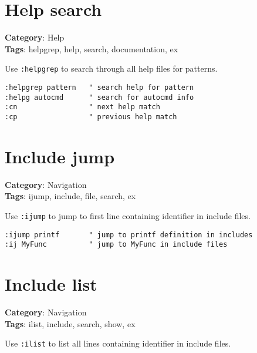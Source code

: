 {{{{{{\section{Help search}

\textbf{Category}: Help\\ \textbf{Tags}: helpgrep, help, search, documentation, ex
\vspace{0.5cm}

Use {\footnotesize \Verb§:helpgrep§} to search through all help files for patterns.

\begin{Exa*}{}
\begin{Verbatim}[fontsize=\footnotesize, breaklines, breakanywhere]
:helpgrep pattern   " search help for pattern
:helpg autocmd      " search for autocmd info
:cn                 " next help match
:cp                 " previous help match
\end{Verbatim}
\end{Exa*}

\section{Include jump}

\textbf{Category}: Navigation\\ \textbf{Tags}: ijump, include, file, search, ex
\vspace{0.5cm}

Use {\footnotesize \Verb§:ijump§} to jump to first line containing identifier in include files.

\begin{Exa*}{}
\begin{Verbatim}[fontsize=\footnotesize, breaklines, breakanywhere]
:ijump printf       " jump to printf definition in includes
:ij MyFunc          " jump to MyFunc in include files
\end{Verbatim}
\end{Exa*}

\section{Include list}

\textbf{Category}: Navigation\\ \textbf{Tags}: ilist, include, search, show, ex
\vspace{0.5cm}

Use {\footnotesize \Verb§:ilist§} to list all lines containing identifier in include files.

}}}}}}
